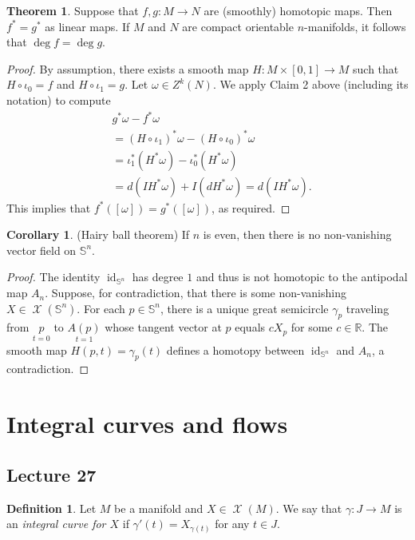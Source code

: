 \documentclass[10pt,letterpaper,cm]{nupset}
\theoremstyle{definition}
\newtheorem*{definition}{Definition}
\newtheorem{theorem}{Theorem}
\newtheorem{corollary}{Corollary}
\newcommand{\R}{\mathbb R}
\renewcommand{\S}{\mathbb S}
\newcommand{\1}{\mathbf{1}}
\newcommand{\0}{\vec 0}
\DeclareMathOperator{\id}{id}
\DeclareMathOperator{\vf}{\mathscr{X}}
\begin{document}
\begin{theorem}
Suppose that $f,g: M \to N$ are (smoothly) homotopic maps. Then $f^{\ast} = g^{\ast}$ as linear maps. If $M$ and $N$ are compact orientable $n$-manifolds, it follows that $\deg f= \deg g$.
\end{theorem}
\begin{proof}
By assumption, there exists a smooth map $H: M \times [0,1] \to M$ such that $H \circ \iota_0 =f$ and $H \circ \iota_1 = g$. Let $\omega \in Z^k(N)$. We apply Claim 2 above (including its notation) to compute
\begin{align*}
& g^{\ast} \omega - f^{\ast} \omega 
\\ & = (H \circ \iota_1)^{\ast} \omega - (H \circ \iota_0)^{\ast} \omega
\\ & = \iota_1^{\ast} (H^{\ast} \omega) -  \iota_0^{\ast} (H^{\ast} \omega)
\\ & = d(IH^{\ast}\omega)+I(dH^{\ast}\omega) = d(IH^{\ast}\omega).
\end{align*} 
This implies that $f^{\ast}([\omega]) = g^{\ast}([\omega])$, as required. 
\end{proof}

\begin{corollary}{(Hairy ball theorem)} 
If $n$ is even, then there is no non-vanishing vector field on $\S^n$.
\end{corollary}
\begin{proof}
The identity $\id_{\S^n}$ has degree $1$ and thus is not homotopic to the antipodal map $A_n$. Suppose, for contradiction, that there is some non-vanishing $X\in \vf(\S^n)$. For each $p\in \S^n$, there is a unique great semicircle $\gamma_p$ traveling from $\underset{t=0}{p}$ to $\underset{t=1}{A(p)}$ whose tangent vector at $p$ equals $c X_p$ for some $c\in \R$. The smooth map $H(p, t) =\gamma_p(t)$ defines a homotopy between $\id_{\S^n}$  and $A_n$, a contradiction. 
\end{proof}

\section{Integral curves and flows}

\subsection{Lecture 27}

\begin{definition}
Let $M$ be a manifold and $X\in \vf(M)$. We say that $\gamma : J \to M$ is an \textit{integral curve for $X$} if $\gamma'(t) = X_{\gamma(t)}$ for any $t\in J$.
\end{definition}
\end{document}
